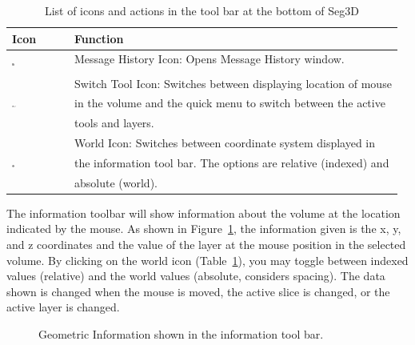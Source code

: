 \documentclass[fleqn,11pt,openany]{book}
\begin{document}
\begin{table}[h!]
\label{tab:toolbaricons}
\caption{List of icons and actions in the tool bar at the bottom of Seg3D}
\begin{tabular}{|l|l|}
\hline
{\bf Icon} & {\bf Function}\\
\hline
\multirow{2}{*}{ \includegraphics[width=0.05\textwidth]{Seg3DBasicFunctionality_figures/TextOff.png} }
& Message History Icon: Opens Message History window.\\
& \\
\hline
\multirow{3}{*}{ \includegraphics[width=0.08\textwidth]{Seg3DBasicFunctionality_figures/SwitchTool.png} }
& Switch Tool Icon:  Switches between displaying location of mouse\\
& in the volume and the quick menu to switch between the active \\
& tools and layers.\\
\hline
\multirow{3}{*}{ \includegraphics[width=0.05\textwidth]{Seg3DBasicFunctionality_figures/WorldOff.png} }
& World Icon:  Switches between coordinate system displayed in \\
& the information tool bar.  The options are relative (indexed) and \\
& absolute (world).\\
\hline
\end{tabular}
\end{table}

The information toolbar will show information about the volume at the location indicated by the mouse.  As shown in Figure~\ref{fig:geometricinfo}, the information given is the x, y, and z coordinates and the value of the layer at the mouse position in the selected volume.  By clicking on the world icon (Table~\ref{tab:toolbaricons}), you may toggle between indexed values (relative) and the world values (absolute, considers spacing).  The data shown is changed when the mouse is moved, the active slice is changed, or the active layer is changed.

\begin{figure}[h!]
\caption{Geometric Information shown in the information tool bar.}\label{fig:geometricinfo}
\end{figure}
\end{document}
